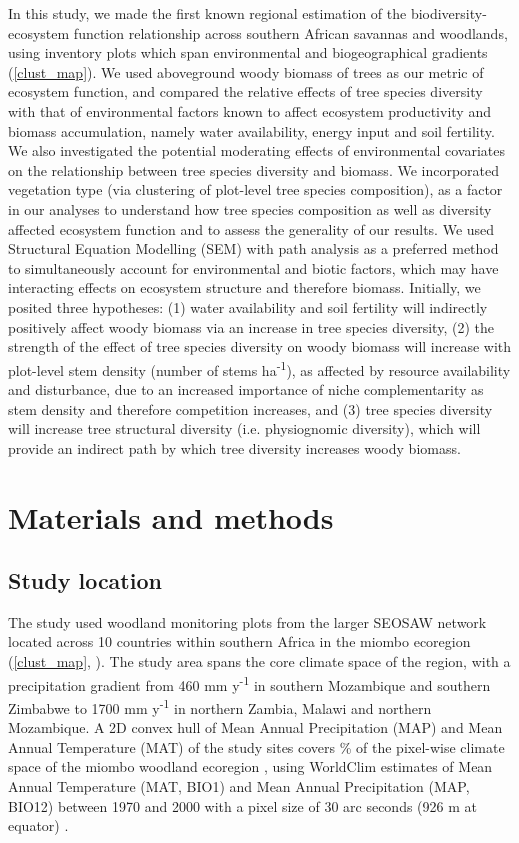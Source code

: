 \documentclass[11pt,a4paper]{article}
\newcommand{\textapprox}{\raisebox{0.5ex}{\texttildelow}}  %
\begin{document}
In this study, we made the first known regional estimation of the biodiversity-ecosystem function relationship across southern African savannas and woodlands, using inventory plots which span environmental and biogeographical gradients (\autoref{clust_map}). We used aboveground woody biomass of trees as our metric of ecosystem function, and compared the relative effects of tree species diversity with that of environmental factors known to affect ecosystem productivity and biomass accumulation, namely water availability, energy input and soil fertility. We also investigated the potential moderating effects of environmental covariates on the relationship between tree species diversity and biomass. We incorporated vegetation type (via clustering of plot-level tree species composition), as a factor in our analyses to understand how tree species composition as well as diversity affected ecosystem function and to assess the generality of our results. We used Structural Equation Modelling (SEM) with path analysis as a preferred method to simultaneously account for environmental and biotic factors, which may have interacting effects on ecosystem structure and therefore biomass. Initially, we posited three hypotheses: (1) water availability and soil fertility will indirectly positively affect woody biomass via an increase in tree species diversity, (2) the strength of the effect of tree species diversity on woody biomass will increase with plot-level stem density (number of stems ha\textsuperscript{-1}), as affected by resource availability and disturbance, due to an increased importance of niche complementarity as stem density and therefore competition increases, and (3) tree species diversity will increase tree structural diversity (i.e. physiognomic diversity), which will provide an indirect path by which tree diversity increases woody biomass.

\section{Materials and methods}

\subsection{Study location}

The study used \nplots{} woodland monitoring plots from the larger SEOSAW network \citep{seosaw_web} located across 10 countries within southern Africa in the miombo ecoregion (\autoref{clust_map}, \citealt{White1987}). The study area spans the core climate space of the region, with a precipitation gradient from \textapprox{}460 mm y\textsuperscript{-1} in southern Mozambique and southern Zimbabwe to \textapprox{}1700 mm y\textsuperscript{-1} in northern Zambia, Malawi and northern Mozambique. A 2D convex hull of Mean Annual Precipitation (MAP) and Mean Annual Temperature (MAT) of the study sites covers \hullcover{}\% of the pixel-wise climate space of the miombo woodland ecoregion  \citep{White1987}, using WorldClim estimates of Mean Annual Temperature (MAT, BIO1) and Mean Annual Precipitation (MAP, BIO12) between 1970 and 2000 with a pixel size of 30 arc seconds (926 m at equator) \citep{Fick2017}. 
\end{document}
